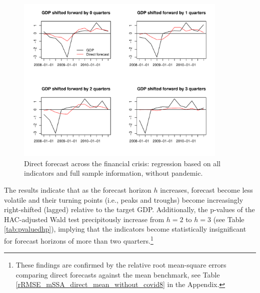 \documentclass[11pt,a4paper]{article}
\begin{document}
\begin{figure}[H]
    \begin{center}
        \includegraphics[width=0.9\textwidth]{./Figures/direct_wc_financial_crisis.pdf}
        \caption{Direct forecast across the financial crisis:  regression based on all indicators and full sample information, without pandemic.
        \label{direct_wc_financial_crisis}}
    \end{center}
\end{figure}

The results indicate that as the forecast horizon $h$ increases, forecast become less volatile and their turning points (i.e., peaks and troughs) become increasingly right-shifted (lagged) relative to the target GDP. Additionally, the p-values of the HAC-adjusted Wald test precipitously increase from $h=2$ to $h=3$ (see Table \ref{tab:pvaluedhp}), implying that the indicators become statistically insignificant for forecast horizons of more than two quarters.\footnote{ 
These findings are confirmed by the relative root mean-square errors comparing direct forecasts against the mean benchmark, see Table \ref{rRMSE_mSSA_direct_mean_without_covid8} in the Appendix.} 

\end{document}
